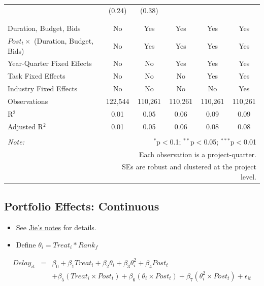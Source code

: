 \documentclass[
]{article}
\providecommand{\tightlist}{%
  \setlength{\itemsep}{0pt}\setlength{\parskip}{0pt}}
\begin{document}
\begin{table}[H]
\begin{tabular}{@{\extracolsep{-2pt}}lccccc}
  & (0.24) & (0.38) &  &  &  \\ 
  & & & & & \\ 
\hline \\[-1.8ex] 
Duration, Budget, Bids & No & Yes & Yes & Yes & Yes \\ 
$Post_t \times$  (Duration, Budget, Bids) & No & Yes & Yes & Yes & Yes \\ 
Year-Quarter Fixed Effects & No & No & Yes & Yes & Yes \\ 
Task Fixed Effects & No & No & No & Yes & Yes \\ 
Industry Fixed Effects & No & No & No & No & Yes \\ 
Observations & 122,544 & 110,261 & 110,261 & 110,261 & 110,261 \\ 
R$^{2}$ & 0.01 & 0.05 & 0.06 & 0.09 & 0.09 \\ 
Adjusted R$^{2}$ & 0.01 & 0.05 & 0.06 & 0.08 & 0.08 \\ 
\hline 
\hline \\[-1.8ex] 
\textit{Note:}  & \multicolumn{5}{r}{$^{*}$p$<$0.1; $^{**}$p$<$0.05; $^{***}$p$<$0.01} \\ 
 & \multicolumn{5}{r}{Each observation is a project-quarter.} \\ 
 & \multicolumn{5}{r}{SEs are robust and clustered at the project level.} \\ 
\end{tabular} 
\end{table}

\hypertarget{portfolio-effects-continuous}{%
\subsection{Portfolio Effects:
Continuous}\label{portfolio-effects-continuous}}

\begin{itemize}
\tightlist
\item
  See
  \href{https://github.com/QuickPay-Operational-Performance/Data-and-code/blob/master/notes/Portfolio\%20model\%2B0308.pdf}{Jie's
  notes} for details.
\item
  Define \(\theta_i = Treat_i*Rank_f\)
\end{itemize}

\[ \begin{aligned} Delay_{it} &=& \beta_0+\beta_1 Treat_i + \beta_2 \theta_i+\beta_3 \theta_i^2+\beta_4 Post_t\\&& + \beta_5 (Treat_i\times Post_t) + \beta_6 (\theta_i\times Post_t) +\beta_7 (\theta_i^2\times Post_t)+\epsilon_{it} \end{aligned} \]
\end{document}
